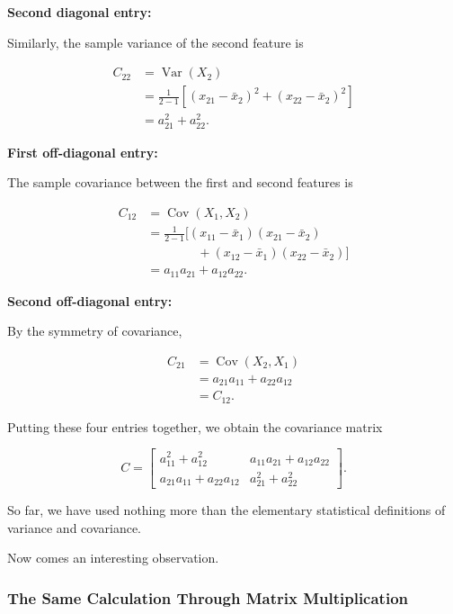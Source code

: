 \documentclass[11pt]{article}
\begin{document}
\textbf{Second diagonal entry:}

Similarly, the sample variance
of the second feature is

\[
\begin{aligned}
C_{22}
&=\operatorname{Var}(X_2)\\
&=\frac{1}{2-1}
\left[
(x_{21}-\bar{x}_2)^2
+
(x_{22}-\bar{x}_2)^2
\right]\\
&=a_{21}^2+a_{22}^2.
\end{aligned}
\]

\textbf{First off-diagonal entry:}

The sample covariance between
the first and second features is

\[
\begin{aligned}
C_{12}
&=\operatorname{Cov}(X_1,X_2)\\
&=\frac{1}{2-1}
\Big[
(x_{11}-\bar{x}_1)
(x_{21}-\bar{x}_2)\\
&\qquad\qquad+
(x_{12}-\bar{x}_1)
(x_{22}-\bar{x}_2)
\Big]\\
&=a_{11}a_{21}+a_{12}a_{22}.
\end{aligned}
\]

\textbf{Second off-diagonal entry:}

By the symmetry of covariance,

\[
\begin{aligned}
C_{21}
&=\operatorname{Cov}(X_2,X_1)\\
&=a_{21}a_{11}+a_{22}a_{12}\\
&=C_{12}.
\end{aligned}
\]

Putting these four entries together,
we obtain the covariance matrix

\[
\boxed{
C=
\begin{bmatrix}
a_{11}^2+a_{12}^2 &
a_{11}a_{21}+a_{12}a_{22}\\[2mm]
a_{21}a_{11}+a_{22}a_{12} &
a_{21}^2+a_{22}^2
\end{bmatrix}.
}
\]

So far, we have used nothing
more than the elementary
statistical definitions of
variance and covariance.

Now comes an interesting observation.

\subsubsection*{The Same Calculation Through
Matrix Multiplication}
\end{document}
